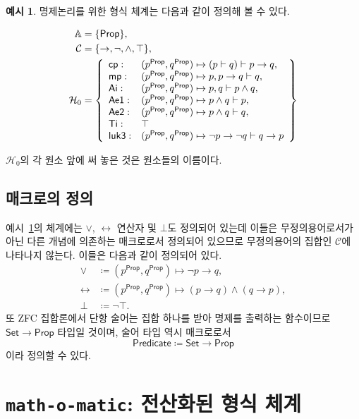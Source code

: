 \documentclass[10pt,twocolumn]{article}
\theoremstyle{definition}
\newtheorem{example}[theorem]{예시}
\newcommand{\Prop}{\mathsf{Prop}}
\newcommand{\Set}{\mathsf{Set}}
\begin{document}
\begin{example}\label{example:system}
	명제논리를 위한 형식 체계는 다음과 같이 정의해 볼 수 있다.
	
	\begin{align*}
		\mathbb A &= \{\mathsf{Prop}\}, \\
		\mathcal C &= \{\to, \neg, \land, \top\}, \\
		\mathcal H_0 &= \left\{\begin{array}{l l}
			\mathsf{cp}: & (p^\Prop, q^\Prop)\mapsto(p\vdash q)\vdash p\to q, \\
			\mathsf{mp}: & (p^\Prop, q^\Prop)\mapsto p, p\to q\vdash q, \\
			\mathsf{Ai}: & (p^\Prop, q^\Prop)\mapsto p, q\vdash p\land q, \\
			\mathsf{Ae1}: & (p^\Prop, q^\Prop)\mapsto p\land q\vdash p, \\
			\mathsf{Ae2}: & (p^\Prop, q^\Prop)\mapsto p\land q\vdash q, \\
			\mathsf{Ti}: & \top \\
			\mathsf{luk3}: & (p^\Prop, q^\Prop)\mapsto \neg p\to\neg q\vdash q\to p
		\end{array}\right\}
	\end{align*}

	$\mathcal H_0$의 각 원소 앞에 써 놓은 것은 원소들의 이름이다.
\end{example}

\subsection{매크로의 정의}

예시~\ref{example:system}의 체계에는 $\lor$, $\leftrightarrow$ 연산자 및 $\bot$도 정의되어 있는데 이들은 무정의용어로서가 아닌 다른 개념에 의존하는 매크로로서 정의되어 있으므로 무정의용어의 집합인 $\mathcal C$에 나타나지 않는다. 이들은 다음과 같이 정의되어 있다.
\begin{align*}
	\lor&\coloneqq (p^\Prop, q^\Prop)\mapsto \neg p\to q, \\
	\leftrightarrow&\coloneqq (p^\Prop, q^\Prop)\mapsto (p\to q)\land(q\to p), \\
	\bot&\coloneqq\neg\top.
\end{align*}
또 ZFC 집합론에서 단항 술어는 집합 하나를 받아 명제를 출력하는 함수이므로 $\Set\to\Prop$ 타입일 것이며, 술어 타입 역시 매크로로서
$$\mathsf{Predicate}\coloneqq\Set\to\Prop$$
이라 정의할 수 있다.

\section{\texttt{math-o-matic}: 전산화된 형식 체계}
\end{document}
